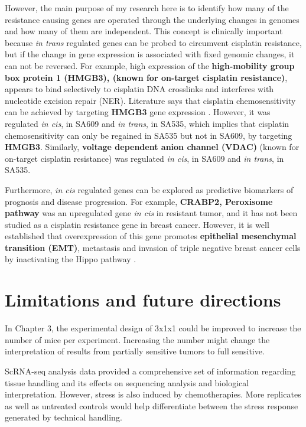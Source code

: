  However, the main purpose of my research here is to identify how many of the resistance causing genes are operated through the underlying changes in genomes and how many of them are independent. This concept is clinically important because \textit{in trans} regulated genes can be probed to circumvent cisplatin resistance, but if the change in gene expression is associated with fixed genomic changes, it can not be reversed. For example,  high expression of the \textbf{high-mobility group box protein 1 (HMGB3), (known for on-target cisplatin resistance)}, appears to bind selectively to cisplatin DNA crosslinks and interferes with nucleotide excision repair (NER).
 Literature says that cisplatin chemosensitivity can be achieved by targeting \textbf{HMGB3} gene expression \cite{awuah2017repair, mukherjee2019targeting}. However, it was regulated \textit{in cis}, in SA609 and \textit{in trans}, in SA535, which implies that cisplatin chemosensitivity can only be regained in SA535 but not in SA609, by targeting \textbf{HMGB3}. Similarly, \textbf{voltage dependent anion channel (VDAC)} (known for on-target cisplatin resistance) \cite{yang2006cisplatin} was regulated \textit{in cis}, in SA609 and \textit{in trans}, in SA535.
 
 Furthermore, \textit{in cis} regulated genes can be explored as predictive biomarkers of prognosis and disease progression. For example, {\textbf{CRABP2, Peroxisome pathway}} was an upregulated gene \textit{in cis} in resistant tumor, and it has not been studied as a cisplatin resistance gene in breast cancer. However, it is well established that overexpression of this gene promotes \textbf{epithelial mesenchymal transition (EMT)}, metastasis and invasion of triple negative breast cancer cells by inactivating the Hippo pathway \cite{feng2019crabp2}.

\section{Limitations and future directions}

In Chapter 3, the experimental design of 3x1x1 could be improved to increase the number of mice per experiment. Increasing the number might change the interpretation of results from partially sensitive tumors to full sensitive. 

ScRNA-seq analysis data provided a comprehensive set of information regarding tissue handling and its effects on sequencing analysis and biological interpretation. 
However, stress is also induced by chemotherapies. More replicates as well as untreated controls would help differentiate between the stress response generated by technical handling.

